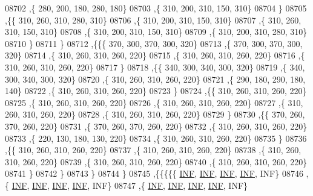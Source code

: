 \begin{DoxyCode}
08702     ,\{   280,   200,   180,   280,   180\}
08703     ,\{   310,   200,   310,   150,   310\}
08704     \}
08705    ,\{\{   310,   260,   310,   280,   310\}
08706     ,\{   310,   200,   310,   150,   310\}
08707     ,\{   310,   260,   310,   150,   310\}
08708     ,\{   310,   200,   310,   150,   310\}
08709     ,\{   310,   200,   310,   280,   310\}
08710     \}
08711    \}
08712   ,\{\{\{   370,   300,   370,   300,   320\}
08713     ,\{   370,   300,   370,   300,   320\}
08714     ,\{   310,   260,   310,   260,   220\}
08715     ,\{   310,   260,   310,   260,   220\}
08716     ,\{   310,   260,   310,   260,   220\}
08717     \}
08718    ,\{\{   340,   300,   340,   300,   320\}
08719     ,\{   340,   300,   340,   300,   320\}
08720     ,\{   310,   260,   310,   260,   220\}
08721     ,\{   290,   180,   290,   180,   140\}
08722     ,\{   310,   260,   310,   260,   220\}
08723     \}
08724    ,\{\{   310,   260,   310,   260,   220\}
08725     ,\{   310,   260,   310,   260,   220\}
08726     ,\{   310,   260,   310,   260,   220\}
08727     ,\{   310,   260,   310,   260,   220\}
08728     ,\{   310,   260,   310,   260,   220\}
08729     \}
08730    ,\{\{   370,   260,   370,   260,   220\}
08731     ,\{   370,   260,   370,   260,   220\}
08732     ,\{   310,   260,   310,   260,   220\}
08733     ,\{   220,   130,   180,   130,   220\}
08734     ,\{   310,   260,   310,   260,   220\}
08735     \}
08736    ,\{\{   310,   260,   310,   260,   220\}
08737     ,\{   310,   260,   310,   260,   220\}
08738     ,\{   310,   260,   310,   260,   220\}
08739     ,\{   310,   260,   310,   260,   220\}
08740     ,\{   310,   260,   310,   260,   220\}
08741     \}
08742    \}
08743   \}
08744  \}
08745 ,\{\{\{\{\{   \hyperlink{constants_8h_a12c2040f25d8e3a7b9e1c2024c618cb6}{INF},   \hyperlink{constants_8h_a12c2040f25d8e3a7b9e1c2024c618cb6}{INF},   \hyperlink{constants_8h_a12c2040f25d8e3a7b9e1c2024c618cb6}{INF},   \hyperlink{constants_8h_a12c2040f25d8e3a7b9e1c2024c618cb6}{INF},   INF\}
08746     ,\{   \hyperlink{constants_8h_a12c2040f25d8e3a7b9e1c2024c618cb6}{INF},   \hyperlink{constants_8h_a12c2040f25d8e3a7b9e1c2024c618cb6}{INF},   \hyperlink{constants_8h_a12c2040f25d8e3a7b9e1c2024c618cb6}{INF},   \hyperlink{constants_8h_a12c2040f25d8e3a7b9e1c2024c618cb6}{INF},   INF\}
08747     ,\{   \hyperlink{constants_8h_a12c2040f25d8e3a7b9e1c2024c618cb6}{INF},   \hyperlink{constants_8h_a12c2040f25d8e3a7b9e1c2024c618cb6}{INF},   \hyperlink{constants_8h_a12c2040f25d8e3a7b9e1c2024c618cb6}{INF},   \hyperlink{constants_8h_a12c2040f25d8e3a7b9e1c2024c618cb6}{INF},   INF\}

\end{DoxyCode}
